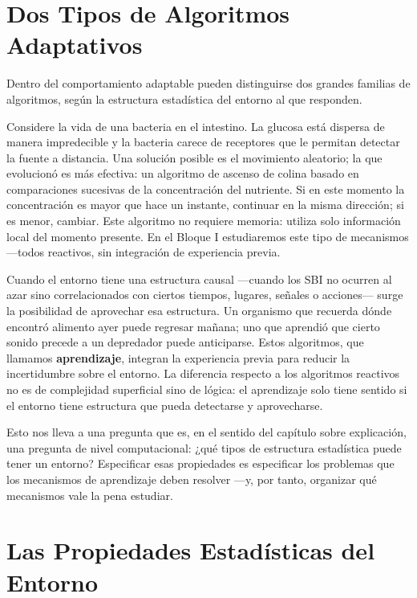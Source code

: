 \documentclass[
  letterpaper,
  DIV=11,
  numbers=noendperiod]{scrreprt}
\begin{document}
\section{Dos Tipos de Algoritmos
Adaptativos}\label{dos-tipos-de-algoritmos-adaptativos}

Dentro del comportamiento adaptable pueden distinguirse dos grandes
familias de algoritmos, según la estructura estadística del entorno al
que responden.

Considere la vida de una bacteria en el intestino. La glucosa está
dispersa de manera impredecible y la bacteria carece de receptores que
le permitan detectar la fuente a distancia. Una solución posible es el
movimiento aleatorio; la que evolucionó es más efectiva: un algoritmo de
ascenso de colina basado en comparaciones sucesivas de la concentración
del nutriente. Si en este momento la concentración es mayor que hace un
instante, continuar en la misma dirección; si es menor, cambiar. Este
algoritmo no requiere memoria: utiliza solo información local del
momento presente. En el Bloque I estudiaremos este tipo de mecanismos
---todos reactivos, sin integración de experiencia previa.

Cuando el entorno tiene una estructura causal ---cuando los SBI no
ocurren al azar sino correlacionados con ciertos tiempos, lugares,
señales o acciones--- surge la posibilidad de aprovechar esa estructura.
Un organismo que recuerda dónde encontró alimento ayer puede regresar
mañana; uno que aprendió que cierto sonido precede a un depredador puede
anticiparse. Estos algoritmos, que llamamos \textbf{aprendizaje},
integran la experiencia previa para reducir la incertidumbre sobre el
entorno. La diferencia respecto a los algoritmos reactivos no es de
complejidad superficial sino de lógica: el aprendizaje solo tiene
sentido si el entorno tiene estructura que pueda detectarse y
aprovecharse.

Esto nos lleva a una pregunta que es, en el sentido del capítulo sobre
explicación, una pregunta de nivel computacional: ¿qué tipos de
estructura estadística puede tener un entorno? Especificar esas
propiedades es especificar los problemas que los mecanismos de
aprendizaje deben resolver ---y, por tanto, organizar qué mecanismos
vale la pena estudiar.

\section{Las Propiedades Estadísticas del
Entorno}\label{las-propiedades-estaduxedsticas-del-entorno}
\end{document}
